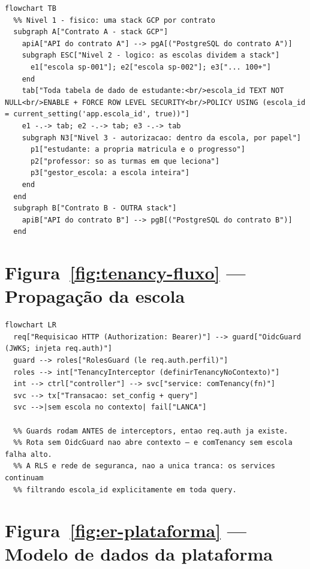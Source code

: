 \begin{lstlisting}[language=mermaid]
flowchart TB
  %% Nivel 1 - fisico: uma stack GCP por contrato
  subgraph A["Contrato A - stack GCP"]
    apiA["API do contrato A"] --> pgA[("PostgreSQL do contrato A")]
    subgraph ESC["Nivel 2 - logico: as escolas dividem a stack"]
      e1["escola sp-001"]; e2["escola sp-002"]; e3["... 100+"]
    end
    tab["Toda tabela de dado de estudante:<br/>escola_id TEXT NOT NULL<br/>ENABLE + FORCE ROW LEVEL SECURITY<br/>POLICY USING (escola_id = current_setting('app.escola_id', true))"]
    e1 -.-> tab; e2 -.-> tab; e3 -.-> tab
    subgraph N3["Nivel 3 - autorizacao: dentro da escola, por papel"]
      p1["estudante: a propria matricula e o progresso"]
      p2["professor: so as turmas em que leciona"]
      p3["gestor_escola: a escola inteira"]
    end
  end
  subgraph B["Contrato B - OUTRA stack"]
    apiB["API do contrato B"] --> pgB[("PostgreSQL do contrato B")]
  end
\end{lstlisting}

\section{Figura~\ref{fig:tenancy-fluxo} --- Propagação da escola}

\begin{lstlisting}[language=mermaid]
flowchart LR
  req["Requisicao HTTP (Authorization: Bearer)"] --> guard["OidcGuard (JWKS; injeta req.auth)"]
  guard --> roles["RolesGuard (le req.auth.perfil)"]
  roles --> int["TenancyInterceptor (definirTenancyNoContexto)"]
  int --> ctrl["controller"] --> svc["service: comTenancy(fn)"]
  svc --> tx["Transacao: set_config + query"]
  svc -->|sem escola no contexto| fail["LANCA"]

  %% Guards rodam ANTES de interceptors, entao req.auth ja existe.
  %% Rota sem OidcGuard nao abre contexto — e comTenancy sem escola falha alto.
  %% A RLS e rede de seguranca, nao a unica tranca: os services continuam
  %% filtrando escola_id explicitamente em toda query.
\end{lstlisting}

\section{Figura~\ref{fig:er-plataforma} --- Modelo de dados da plataforma}

